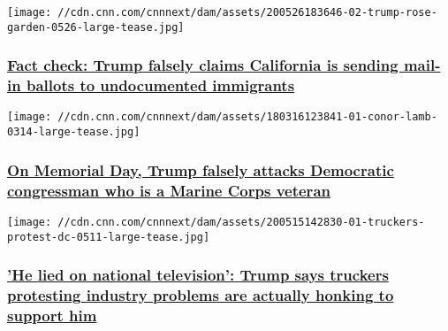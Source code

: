 \href{/2020/05/26/politics/fact-check-trump-vote-by-mail-fraud-gavin-newsom-california/index.html}{}

\texttt{[image: //cdn.cnn.com/cnnnext/dam/assets/200526183646-02-trump-rose-garden-0526-large-tease.jpg]}

\hypertarget{fact-check-trump-falsely-claims-california-is-sending-mail-in-ballots-to-undocumented-immigrants}{%
\subsubsection{\texorpdfstring{\href{/2020/05/26/politics/fact-check-trump-vote-by-mail-fraud-gavin-newsom-california/index.html}{Fact
check: Trump falsely claims California is sending mail-in ballots to
undocumented
immigrants}}{Fact check: Trump falsely claims California is sending mail-in ballots to undocumented immigrants}}\label{fact-check-trump-falsely-claims-california-is-sending-mail-in-ballots-to-undocumented-immigrants}}

\href{/2020/05/26/politics/fact-check-trump-conor-lamb-pelosi/index.html}{}

\texttt{[image: //cdn.cnn.com/cnnnext/dam/assets/180316123841-01-conor-lamb-0314-large-tease.jpg]}

\hypertarget{on-memorial-day-trump-falsely-attacks-democratic-congressman-who-is-a-marine-corps-veteran}{%
\subsubsection{\texorpdfstring{\href{/2020/05/26/politics/fact-check-trump-conor-lamb-pelosi/index.html}{On
Memorial Day, Trump falsely attacks Democratic congressman who is a
Marine Corps
veteran}}{On Memorial Day, Trump falsely attacks Democratic congressman who is a Marine Corps veteran}}\label{on-memorial-day-trump-falsely-attacks-democratic-congressman-who-is-a-marine-corps-veteran}}

\href{/2020/05/15/politics/fact-check-trump-trucker-protest/index.html}{}

\texttt{[image: //cdn.cnn.com/cnnnext/dam/assets/200515142830-01-truckers-protest-dc-0511-large-tease.jpg]}

\hypertarget{he-lied-on-national-television-trump-says-truckers-protesting-industry-problems-are-actually-honking-to-support-him}{%
\subsubsection{\texorpdfstring{\href{/2020/05/15/politics/fact-check-trump-trucker-protest/index.html}{'He
lied on national television': Trump says truckers protesting industry
problems are actually honking to support
him}}{'He lied on national television': Trump says truckers protesting industry problems are actually honking to support him}}\label{he-lied-on-national-television-trump-says-truckers-protesting-industry-problems-are-actually-honking-to-support-him}}

